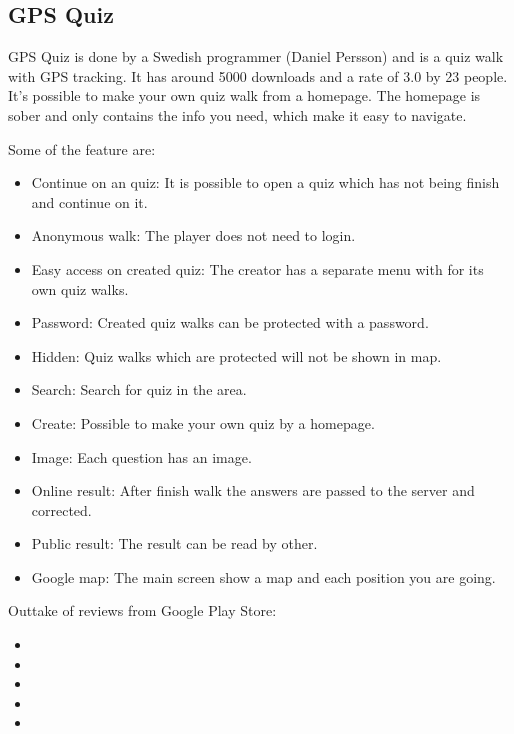 \documentclass{TDP003mall}
\begin{document}
\subsection{GPS Quiz}
GPS Quiz is done by a Swedish programmer (Daniel Persson) and is a quiz walk with GPS tracking.
It has around 5000 downloads and a rate of 3.0 by 23 people. It's possible to make your own quiz walk
from a homepage. The homepage is sober and only contains the info you need, which make it easy to navigate.

Some of the feature are:
\begin{itemize}
	\item Continue on an quiz: It is possible to open a quiz which has not being finish and continue on it.
	\item Anonymous walk: The player does not need to login.
	\item Easy access on created quiz: The creator has a separate menu with for its own quiz walks.
	\item Password: Created quiz walks can be protected with a password.
	\item Hidden: Quiz walks which are protected will not be shown in map.
	\item Search: Search for quiz in the area.
	\item Create: Possible to make your own quiz by a homepage.
	\item Image: Each question has an image.
	\item Online result: After finish walk the answers are passed to the server and corrected.
	\item Public result: The result can be read by other.
	\item Google map: The main screen show a map and each position you are going.
\end{itemize}

Outtake of reviews from Google Play Store:
\begin{itemize}
	\item {}
	\item {}
	\item {}
	\item {}
	\item {}
\end{itemize}
\end{document}
